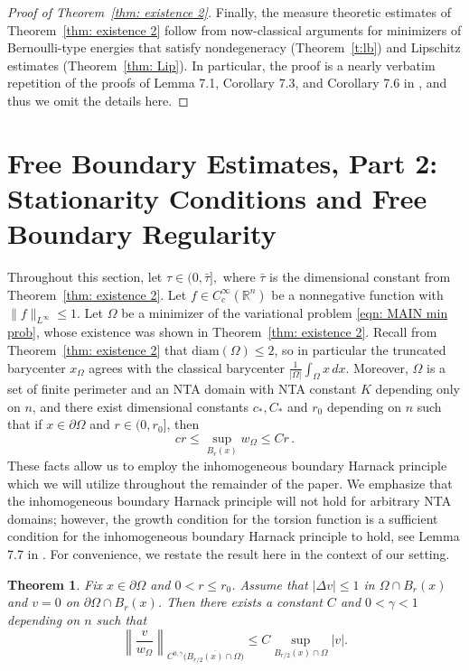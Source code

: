 \documentclass[10pt, reqno]{amsart}
\numberwithin{equation}{section}
\newtheorem{theorem}{Theorem}[section]
\def\R{{\mathbb R}}
\def\W{\Omega}
\begin{document}
\begin{proof}[Proof of Theorem~\ref{thm: existence 2}]
 Finally, the measure theoretic estimates of Theorem~\ref{thm: existence 2} follow from  now-classical arguments for minimizers of Bernoulli-type energies that satisfy nondegeneracy (Theorem~\ref{t:lb}) and Lipschitz estimates (Theorem~\ref{thm: Lip}). In particular, the proof is a nearly verbatim repetition of the proofs of Lemma 7.1, Corollary 7.3, and Corollary 7.6 in \cite{AKN1}, and thus we omit the details here.
    \end{proof}


    

 \section{Free Boundary Estimates, Part 2: Stationarity Conditions and Free Boundary Regularity}
\label{sec: FB2}
Throughout this section, let  $\tau \in (0,\bar{\tau}],$ where $\bar{\tau}$ is the dimensional constant from Theorem~\ref{thm: existence 2}.  Let $f \in C^\infty_c(\R^n)$ be a nonnegative function with $\|f \|_{L^{\infty}}\leq 1$.
Let $\W$ be a minimizer of the variational problem \eqref{eqn: MAIN min prob}, whose existence was shown in Theorem~\ref{thm: existence 2}. Recall from Theorem~\ref{thm: existence 2} that $\text{diam}(\W) \leq 2$, so in particular the truncated barycenter $x_\W$ agrees with the classical barycenter $\frac{1}{|\W|}\int_\W x\,dx.$ Moreover, $\W$ is a set of finite perimeter and an NTA domain with NTA constant $K$ depending only on $n$,  and there exist dimensional constants $c_*,C_*$ and $r_0$ depending on $n$ such that if $x \in \partial \W$ and  $r\in (0,r_0]$, then 
\[
 cr \leq \sup_{B_r(x)} w_{\W} \leq Cr\,.
\]
{These facts allow us to employ the inhomogeneous boundary Harnack principle \cite[Theorem 2.2]{aks23} which we will utilize throughout the remainder of the paper. We emphasize that the inhomogeneous boundary Harnack principle will not hold for arbitrary NTA domains; however, the growth condition for the torsion function is a sufficient condition for the inhomogeneous boundary Harnack principle to hold, see Lemma 7.7 in \cite{AKN2}. For convenience, we restate the result here in the context of our setting. }
\begin{theorem} \label{t:bhpf} Fix  $x \in \partial \W$ and  $0<r\leq r_0$.
Assume that $|\Delta v|\leq 1$ in $\W \cap B_r(x)$ and $v=0$ on $\partial \W \cap B_r(x)$. Then there exists a constant $C$ and $0<\gamma<1$ depending on $n$ such that 
    \[
    \left\|\frac{v}{w_{\W}} \right\|_{C^{0,\gamma}(\overline{B_{r/2}(x)\cap \W)}}
    \leq C \sup_{B_{r/2}(x) \cap \W} |v|. 
    \]
\end{theorem}
\end{document}
